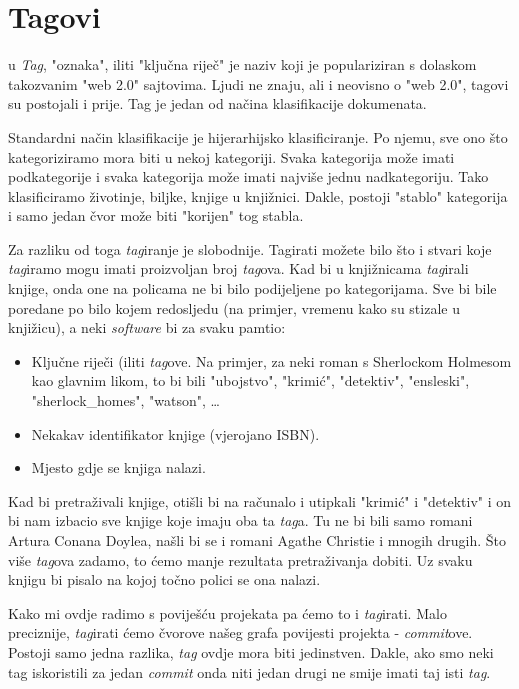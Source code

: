 \chapter*{Tagovi}
u
\emph{Tag}, "oznaka", iliti "ključna riječ" je naziv koji je populariziran s dolaskom takozvanim "web 2.0" sajtovima. 
Ljudi ne znaju, ali i neovisno o "web 2.0", tagovi su postojali i prije. 
Tag je jedan od načina klasifikacije dokumenata.

Standardni način klasifikacije je hijerarhijsko klasificiranje.
Po njemu, sve ono što kategoriziramo mora biti u nekoj kategoriji.
Svaka kategorija može imati podkategorije i svaka kategorija može imati najviše jednu nadkategoriju.
Tako klasificiramo životinje, biljke, knjige u knjižnici.
Dakle, postoji "stablo" kategorija i samo jedan čvor može biti "korijen" tog stabla.

Za razliku od toga \emph{tag}iranje je slobodnije.
Tagirati možete bilo što i stvari koje \emph{tag}iramo mogu imati proizvoljan broj \emph{tag}ova.
Kad bi u knjižnicama \emph{tag}irali knjige, onda one na policama ne bi bilo podijeljene po kategorijama.
Sve bi bile poredane po bilo kojem redosljedu (na primjer, vremenu kako su stizale u knjižicu), a neki \emph{software} bi za svaku pamtio:

\begin{itemize}
	\item Ključne riječi (iliti \emph{tag}ove. Na primjer, za neki roman s Sherlockom Holmesom kao glavnim likom, to bi bili "ubojstvo", "krimić", "detektiv", "ensleski", "sherlock\_homes", "watson", \dots
	\item Nekakav identifikator knjige (vjerojano ISBN).
	\item Mjesto gdje se knjiga nalazi.
\end{itemize}

Kad bi pretraživali knjige, otišli bi na računalo i utipkali "krimić" i "detektiv" i on bi nam izbacio sve knjige koje imaju oba ta \emph{tag}a.
Tu ne bi bili samo romani Artura Conana Doylea, našli bi se i romani Agathe Christie i mnogih drugih. 
Što više \emph{tag}ova zadamo, to ćemo manje rezultata pretraživanja dobiti.
Uz svaku knjigu bi pisalo na kojoj točno polici se ona nalazi.

Kako mi ovdje radimo s poviješću projekata pa ćemo to i \emph{tag}irati.
Malo preciznije, \emph{tag}irati ćemo čvorove našeg grafa povijesti projekta - \emph{commit}ove.
Postoji samo jedna razlika, \emph{tag} ovdje mora biti jedinstven.
Dakle, ako smo neki tag iskoristili za jedan \emph{commit} onda niti jedan drugi ne smije imati taj isti \emph{tag}.

